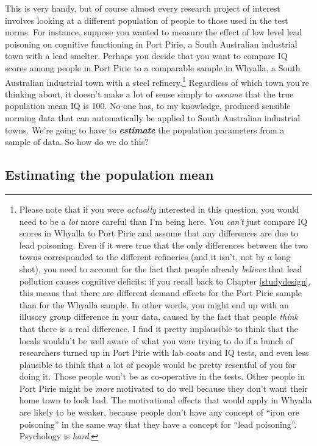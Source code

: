 \documentclass[
]{book}
\begin{document}
This is very handy, but of course almost every research project of interest involves looking at a different population of people to those used in the test norms. For instance, suppose you wanted to measure the effect of low level lead poisoning on cognitive functioning in Port Pirie, a South Australian industrial town with a lead smelter. Perhaps you decide that you want to compare IQ scores among people in Port Pirie to a comparable sample in Whyalla, a South Australian industrial town with a steel refinery.\footnote{Please note that if you were \emph{actually} interested in this question, you would need to be a \emph{lot} more careful than I'm being here. You \emph{can't} just compare IQ scores in Whyalla to Port Pirie and assume that any differences are due to lead poisoning. Even if it were true that the only differences between the two towns corresponded to the different refineries (and it isn't, not by a long shot), you need to account for the fact that people already \emph{believe} that lead pollution causes cognitive deficits: if you recall back to Chapter \ref{studydesign}, this means that there are different demand effects for the Port Pirie sample than for the Whyalla sample. In other words, you might end up with an illusory group difference in your data, caused by the fact that people \emph{think} that there is a real difference. I find it pretty implausible to think that the locals wouldn't be well aware of what you were trying to do if a bunch of researchers turned up in Port Pirie with lab coats and IQ tests, and even less plausible to think that a lot of people would be pretty resentful of you for doing it. Those people won't be as co-operative in the tests. Other people in Port Pirie might be \emph{more} motivated to do well because they don't want their home town to look bad. The motivational effects that would apply in Whyalla are likely to be weaker, because people don't have any concept of ``iron ore poisoning'' in the same way that they have a concept for ``lead poisoning''. Psychology is \emph{hard}.} Regardless of which town you're thinking about, it doesn't make a lot of sense simply to \emph{assume} that the true population mean IQ is 100. No-one has, to my knowledge, produced sensible norming data that can automatically be applied to South Australian industrial towns. We're going to have to \textbf{\emph{estimate}} the population parameters from a sample of data. So how do we do this?

\hypertarget{estimating-the-population-mean}{%
\subsection{Estimating the population mean}\label{estimating-the-population-mean}}
\end{document}
